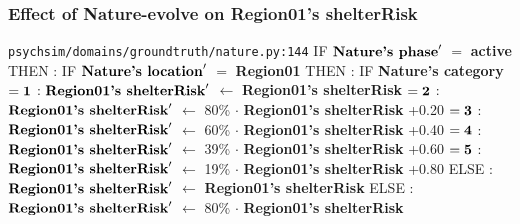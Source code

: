 \documentclass{article}%
\begin{document}
\subsubsection{Effect of Nature{-}evolve on Region01's shelterRisk}%
\label{ssubsec:Effect of Nature{-}evolve on Region01's shelterRisk}%
\begin{flushleft}%
\verb|psychsim/domains/groundtruth/nature.py:144|%
\linebreak%
IF %
$\mbox{\textbf{Nature's phase}} '$%
$=$%
\textbf{active}%
\linebreak%
\hspace*{2em}%
THEN %
: %
IF %
$\mbox{\textbf{Nature's location}} '$%
$=$%
\textbf{Region01}%
\linebreak%
\hspace*{4em}%
THEN %
: %
IF %
\textbf{Nature's category}%
\linebreak%
\hspace*{6em}%
$= \mbox{\textbf{1}}$%
: %
$\mbox{\textbf{Region01's shelterRisk}} '$%
$\leftarrow$%
\textbf{Region01's shelterRisk}%
\linebreak%
\hspace*{6em}%
$= \mbox{\textbf{2}}$%
: %
$\mbox{\textbf{Region01's shelterRisk}} '$%
$\leftarrow$%
80\%%
$\cdot$%
\textbf{Region01's shelterRisk}%
+0.20%
\linebreak%
\hspace*{6em}%
$= \mbox{\textbf{3}}$%
: %
$\mbox{\textbf{Region01's shelterRisk}} '$%
$\leftarrow$%
60\%%
$\cdot$%
\textbf{Region01's shelterRisk}%
+0.40%
\linebreak%
\hspace*{6em}%
$= \mbox{\textbf{4}}$%
: %
$\mbox{\textbf{Region01's shelterRisk}} '$%
$\leftarrow$%
39\%%
$\cdot$%
\textbf{Region01's shelterRisk}%
+0.60%
\linebreak%
\hspace*{6em}%
$= \mbox{\textbf{5}}$%
: %
$\mbox{\textbf{Region01's shelterRisk}} '$%
$\leftarrow$%
19\%%
$\cdot$%
\textbf{Region01's shelterRisk}%
+0.80%
\linebreak%
\hspace*{4em}%
ELSE %
: %
$\mbox{\textbf{Region01's shelterRisk}} '$%
$\leftarrow$%
\textbf{Region01's shelterRisk}%
\linebreak%
\hspace*{2em}%
ELSE %
: %
$\mbox{\textbf{Region01's shelterRisk}} '$%
$\leftarrow$%
80\%%
$\cdot$%
\textbf{Region01's shelterRisk}%
\end{flushleft}
\end{document}
